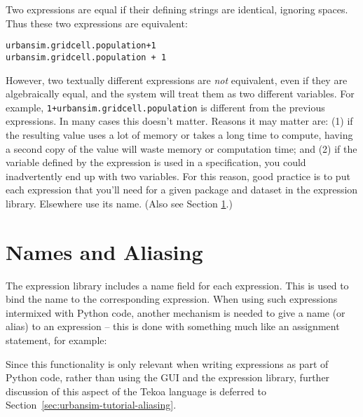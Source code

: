 Two expressions are equal if their defining strings are identical, ignoring
spaces.  Thus these two expressions are equivalent:

\begin{verbatim}
urbansim.gridcell.population+1
urbansim.gridcell.population + 1
\end{verbatim}

However, two textually different expressions are \emph{not} equivalent,
even if they are algebraically equal, and the system will treat them as
two different variables.  For example,
\verb|1+urbansim.gridcell.population| is different from the previous
expressions.  In many cases this doesn't matter.  Reasons it may matter
are: (1) if the resulting value uses a lot of memory or takes a long time
to compute, having a second copy of the value will waste memory or
computation time; and (2) if the variable defined by the expression is used
in a specification, you could inadvertently end up with two variables.  For
this reason, good practice is to put each expression that you'll need for a
given package and dataset in the expression library.  Elsewhere use its
name.  (Also see Section \ref{sec:expressions-aliasing}.)

\section{Names and Aliasing}
\label{sec:expressions-aliasing}

The expression library includes a name field for each expression.  This is
used to bind the name to the corresponding expression.  When using such
expressions intermixed with Python code, another mechanism is needed to
give a name (or alias) to an expression -- this is done with something much
like an assignment statement, for example:


Since this functionality is only relevant when writing expressions as part
of Python code, rather than using the GUI and the expression library,
further discussion of this aspect of the Tekoa language is deferred to
Section~\ref{sec:urbansim-tutorial-aliasing}.
